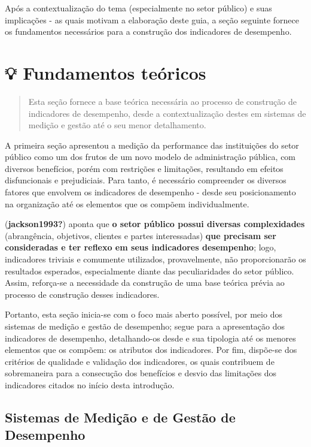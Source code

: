 \documentclass[
  letterpaper,
  DIV=11,
  numbers=noendperiod]{scrreprt}
\begin{document}
Após a contextualização do tema (especialmente no setor público) e suas
implicações - as quais motivam a elaboração deste guia, a seção seguinte
fornece os fundamentos necessários para a construção dos indicadores de
desempenho.

\part{💡 Fundamentos teóricos}

\begin{quote}
Esta seção fornece a base teórica necessária ao processo de construção
de indicadores de desempenho, desde a contextualização destes em
sistemas de medição e gestão até o seu menor detalhamento.
\end{quote}

A primeira seção apresentou a medição da performance das instituições do
setor público como um dos frutos de um novo modelo de administração
pública, com diversos benefícios, porém com restrições e limitações,
resultando em efeitos disfuncionais e prejudiciais. Para tanto, é
necessário compreender os diversos fatores que envolvem os indicadores
de desempenho - desde seu posicionamento na organização até os elementos
que os compõem individualmente.

(\textbf{jackson1993?}) aponta que \textbf{o setor público possui
diversas complexidades} (abrangência, objetivos, clientes e partes
interessadas) \textbf{que precisam ser consideradas e ter reflexo em
seus indicadores desempenho}; logo, indicadores triviais e comumente
utilizados, provavelmente, não proporcionarão os resultados esperados,
especialmente diante das peculiaridades do setor público. Assim,
reforça-se a necessidade da construção de uma base teórica prévia ao
processo de construção desses indicadores.

Portanto, esta seção inicia-se com o foco mais aberto possível, por meio
dos sistemas de medição e gestão de desempenho; segue para a
apresentação dos indicadores de desempenho, detalhando-os desde e sua
tipologia até os menores elementos que os compõem: os atributos dos
indicadores. Por fim, dispõe-se dos critérios de qualidade e validação
dos indicadores, os quais contribuem de sobremaneira para a consecução
dos benefícios e desvio das limitações dos indicadores citados no início
desta introdução.

\hypertarget{sistemas-de-mediuxe7uxe3o-e-de-gestuxe3o-de-desempenho}{%
\chapter{Sistemas de Medição e de Gestão de
Desempenho}\label{sistemas-de-mediuxe7uxe3o-e-de-gestuxe3o-de-desempenho}}
\end{document}
